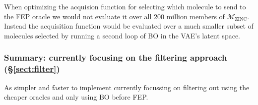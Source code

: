 \documentclass{article}
\begin{document}
When optimizing the acquision function for selecting which molecule to send to the FEP oracle we would not evaluate it
over all 200 million members of $\mathcal{M}_{\textrm{ZINC}}$. 
Instead the acquisition function would be evaluated over a much smaller subset of molecules selected by running a second loop
of BO in the VAE's latent space.

\subsubsection{Summary: currently focusing on the filtering approach (\S\ref{sect:filter})}
As simpler and faster to implement currently focussing on filtering out using the cheaper oracles and only using BO before FEP.







\end{document}
